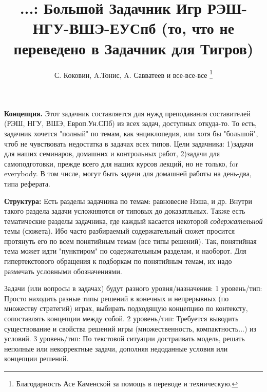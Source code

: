 \documentclass[a4paper,12pt]{article}
\begin{document}

\title{ ...: {\huge Большой Задачник Игр РЭШ-НГУ-ВШЭ-ЕУСпб (то, что не переведено в Задачник для Тигров)}}
\author{С. Коковин, A.Тонис, A. Савватеев и все-все-все  \thanks{Благодарность
Асе Каменской за помощь в переводе и техническую.} }
\maketitle

{\bf Концепция.} Этот задачник составляется для
нужд преподавания составителей (РЭШ, НГУ, ВШЭ,
Европ.Ун.СПб) из всех задач, доступных откуда-то.
То есть, задачник хочется "полный" по темам, как
энциклопедия, или хотя бы "большой", чтоб не
чувствовать недостатка в задачах всех типов. Цели
задачника: 1)задачи для наших семинаров, домашних и
контрольных работ, 2)задачи для самоподготовки,
прежде всего для наших курсов лекций, но не только,
for everybody. В том числе, могут быть задачи для
домашней работы на день-два, типа реферата.\medskip

{\bf Структура:} Есть разделы задачника по темам:
равновесие Нэша, и др. Внутри такого раздела задачи
усложняются от типовых до доказатльных. Также есть
тематические разделы задачника, где каждый касается
некоторой {\em содержательной} темы (сюжета). Ибо
часто разбираемый содержательный сюжет просится
протянуть его по всем понятийным темам (все типы
решений). Так, понятийная тема может идти
"пунктиром" по содержательным разделам, и наоборот.
Для гипертекстового обращения к подборкам по
понятийным темам, их надо размечать условными
обозначениями.\medskip

Задачи (или вопросы в задачах) будут разного
уровня/назначения: 1 уровень/тип: Просто находить разные
типы решений в конечных и непрерывных (по множеству
стратегий) играх, выбирать подходящую концепцию по
контексту, сопоставлять концепции между собой. 2
уровень/тип: Требуется выводить существование и свойства
решений игры (множественность, компактность...) из условий.
3 уровень/тип: По текстовой ситуации достраивать модель,
решать неполные или некорректные задачи, дополняя
недоданные условия или концепции решений.\vspace{2mm}
\end{document}

